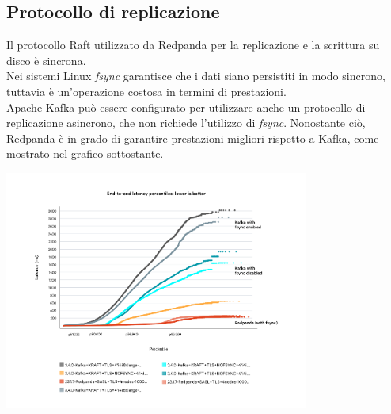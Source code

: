 \subsection{Protocollo di replicazione}
Il protocollo Raft utilizzato da Redpanda per la replicazione e la scrittura su disco è sincrona. \\
Nei sistemi Linux \textit{fsync} garantisce che i dati siano persistiti in modo sincrono, tuttavia
è un'operazione costosa in termini di prestazioni.\\
Apache Kafka può essere configurato per utilizzare anche un protocollo di replicazione asincrono, che non richiede l'utilizzo di \textit{fsync}.
Nonostante ciò, Redpanda è in grado di garantire prestazioni migliori rispetto a Kafka, come mostrato nel grafico sottostante.

\begin{center}
	\includegraphics[width=0.75\textwidth]{imgs/fsync.png}
\end{center}




























